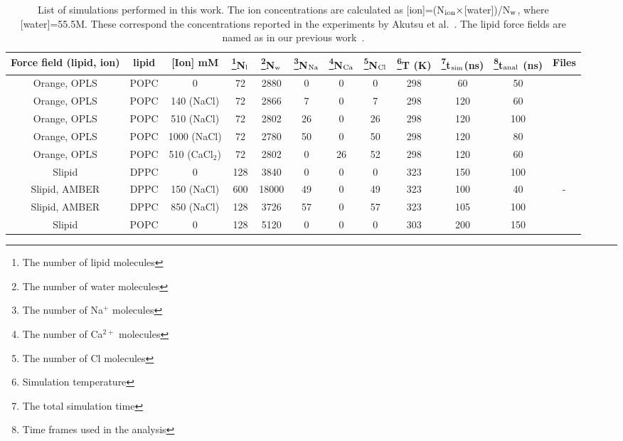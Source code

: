 \documentclass[twoside,twocolumn,9pt]{article}
\begin{document}
\begin{table}
\centering
\caption{List of simulations performed in this work. The ion concentrations are calculated as 
   [ion]=(N$_{\rm ion} \times$[water])/N$_{\rm w}$, where [water]=55.5M. 
   These correspond the concentrations reported in the experiments by Akutsu et al.~\cite{akutsu81}.
   The lipid force fields are named as in our previous work~\cite{botan15}.}\label{IONsystems2}
\begin{tabular}{c c c c c c c c c c c c}
  Force field (lipid, ion)& lipid & [Ion] mM & \footnote{The number of lipid molecules}N$_{\rm l}$   &  \footnote{The number of water molecules}N$_{\rm w}$   & \footnote{The number of Na$^+$ molecules}N$_{\rm Na}$  & \footnote{The number of Ca$^{2+}$ molecules}N$_{\rm Ca}$   &  \footnote{The number of Cl molecules}N$_{\rm Cl}$ & \footnote{Simulation temperature}T (K)  & \footnote{The total simulation time}t$_{{\rm sim}}$(ns) & \footnote{Time frames used in the analysis}t$_{{\rm anal}}$ (ns) & Files\\
  \hline
  Orange, OPLS\cite{aqvist90}  &   POPC & 0 & 72 & 2880 & 0 & 0  & 0 & 298 & 60 & 50 & \cite{orangePOPCfiles}  \\
  Orange, OPLS\cite{aqvist90} &   POPC & 140 (NaCl) & 72 & 2866 & 7 & 0  & 7 & 298 & 120 & 60 &\cite{orangePOPC140mMNaClfiles}  \\
  Orange, OPLS\cite{aqvist90}  &   POPC & 510 (NaCl) & 72 & 2802 & 26 & 0  & 26 & 298 & 120 & 100 &\cite{orangePOPC510mMNaClfiles}   \\
  Orange, OPLS\cite{aqvist90}  &   POPC & 1000 (NaCl) & 72 & 2780 & 50 & 0  & 50 & 298 & 120 & 80 & \cite{orangePOPC1000mMNaClfiles} \\
  Orange, OPLS &   POPC & 510 (CaCl$_2$)  & 72 & 2802 & 0 & 26  & 52 & 298 & 120 & 60 & \cite{orangePOPC510mMCaClfiles}  \\
  \hline
  Slipid\cite{jambeck12}   &   DPPC & 0 & 128 &3840 & 0 & 0  & 0 & 323 & 150 & 100 &~\cite{slipidsFILES}  \\
  Slipid\cite{jambeck12}, AMBER\cite{beglov94,roux96} &   DPPC & 150 (NaCl)  & 600 & 18000 & 49 & 0  &  49 & 323 & 100 & 40 &-  \\
  Slipid\cite{jambeck12}, AMBER\cite{beglov94,roux96} &   DPPC & 850 (NaCl)  & 128 & 3726 &  57 & 0  &  57 & 323 & 105 & 100 & \cite{slipidsFILESdppc}  \\
  \hline
  Slipid\cite{jambeck12b}   &   POPC & 0 & 128 & 5120 & 0 & 0  & 0 & 303 & 200 & 150 &~\cite{slipidsFILESpopc}  \\

\end{tabular}
\end{table}
\end{document}
